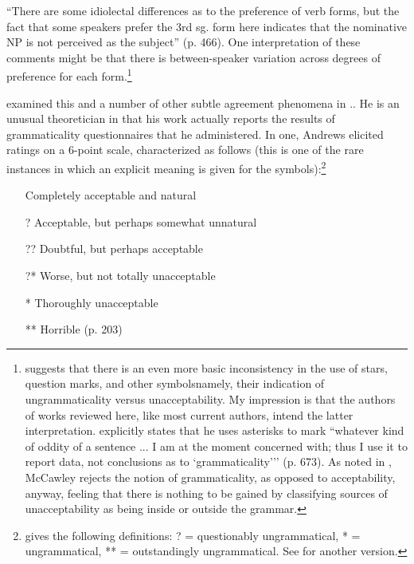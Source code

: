 \noindent
``There are some idiolectal differences as to the preference of verb forms, but the fact that some speakers prefer the 3rd sg. form here indicates that the nominative NP is not perceived as the subject'' (p. 466). One interpretation of these comments might be that there is between-speaker variation across degrees of preference for each form.\footnote{\citet{Newmeyer1983} suggests that there is an even more basic inconsistency in the use of stars, question marks, and other symbols\schdash{}namely, their indication of ungrammaticality versus unacceptability. My impression is that the authors of works reviewed here, like most current authors, intend the latter interpretation. \citet{McCawley1985} explicitly states that he uses asterisks to mark ``whatever kind of oddity of a sentence ... I am at the moment concerned with; thus I use it to report data, not conclusions as to `grammaticality\textquoteright{}'' (p. 673). As noted in , McCawley rejects the notion of grammaticality, as opposed to acceptability, anyway, feeling that there is nothing to be gained by classifying sources of unacceptability as being inside or outside the grammar.
}


\citet{Andrews1990} examined this and a number of other subtle agreement phenomena in .. He is an unusual theoretician in that his work actually reports the results of grammaticality questionnaires that he administered. In one, Andrews elicited ratings on a 6-point scale, characterized as follows (this is one of the rare instances in which an explicit meaning is given for the symbols):\footnote{\citet{Labov1972b} gives the following definitions: ? = questionably ungrammatical, * = ungrammatical, ** = outstandingly ungrammatical. See \citet{Householder1973} for another version.}

\begin{itemize}
 \item[{\checkmark}] Completely acceptable and natural
 \item[?] Acceptable, but perhaps somewhat unnatural
 \item[??]  Doubtful, but perhaps acceptable
 \item[?*] Worse, but not totally unacceptable
 \item[*] Thoroughly unacceptable
 \item[**] Horrible (p. 203)
\end{itemize}

